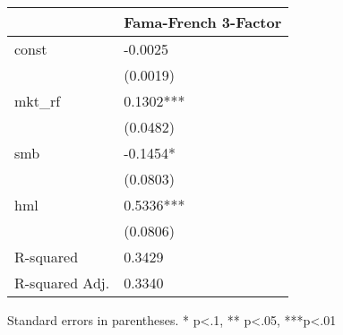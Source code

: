 \begin{table}
\caption{}
\label{}
\begin{center}
\begin{tabular}{ll}
\hline
               & Fama-French 3-Factor  \\
\hline
const          & -0.0025               \\
               & (0.0019)              \\
mkt\_rf        & 0.1302***             \\
               & (0.0482)              \\
smb            & -0.1454*              \\
               & (0.0803)              \\
hml            & 0.5336***             \\
               & (0.0806)              \\
R-squared      & 0.3429                \\
R-squared Adj. & 0.3340                \\
\hline
\end{tabular}
\end{center}
\end{table}
\bigskip
Standard errors in parentheses. \newline 
* p<.1, ** p<.05, ***p<.01